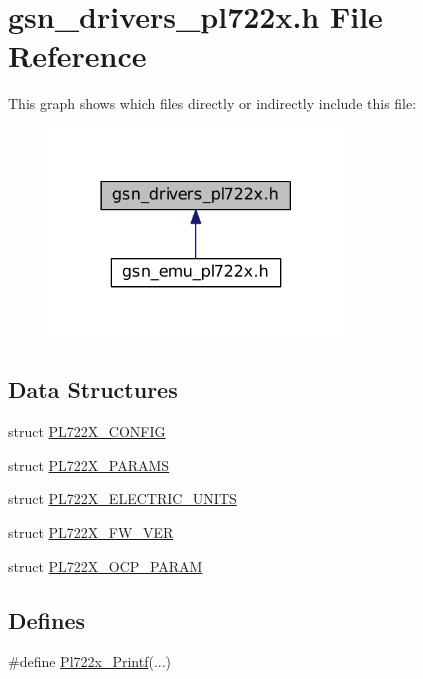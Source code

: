 \hypertarget{a00486}{
\section{gsn\_\-drivers\_\-pl722x.h File Reference}
\label{a00486}
}
This graph shows which files directly or indirectly include this file:
\nopagebreak
\begin{figure}[H]
\begin{center}
\leavevmode
\includegraphics[width=222pt]{a00716}
\end{center}
\end{figure}
\subsection*{Data Structures}
\begin{DoxyCompactItemize}
\item 
struct \hyperlink{a00449}{PL722X\_\-CONFIG}
\item 
struct \hyperlink{a00453}{PL722X\_\-PARAMS}
\item 
struct \hyperlink{a00450}{PL722X\_\-ELECTRIC\_\-UNITS}
\item 
struct \hyperlink{a00451}{PL722X\_\-FW\_\-VER}
\item 
struct \hyperlink{a00452}{PL722X\_\-OCP\_\-PARAM}
\end{DoxyCompactItemize}
\subsection*{Defines}
\begin{DoxyCompactItemize}
\item 
\#define \hyperlink{a00486_a8ed206bcae8ff07f3be218a4283ed5d5}{Pl722x\_\-Printf}(...)
\end{DoxyCompactItemize}
